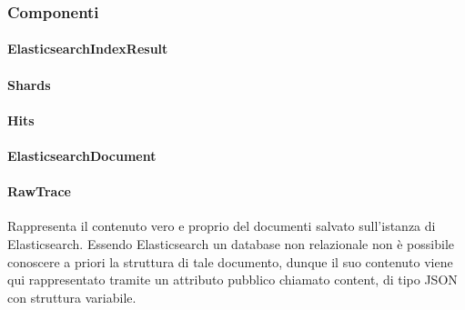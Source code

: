 \subsubsection{Componenti} \Spazio
\paragraph{ElasticsearchIndexResult} \Spazio
\paragraph{Shards} \Spazio
\paragraph{Hits} \Spazio
\paragraph{ElasticsearchDocument} \Spazio
\paragraph{RawTrace} \Spazio
Rappresenta il contenuto vero e proprio del documenti salvato sull'istanza di Elasticsearch. Essendo Elasticsearch un database non relazionale non è possibile conoscere a priori la struttura di tale documento, dunque il suo contenuto viene qui rappresentato tramite un attributo pubblico chiamato content, di tipo JSON con struttura variabile.

